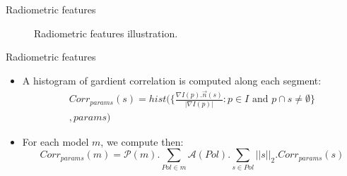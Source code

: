 \documentclass{beamer}
\begin{document}
            \begin{frame}{Radiometric features}
                \begin{figure}

                    \caption{\label{fig::radiometric} Radiometric features illustration.}
                \end{figure}
            \end{frame}
            \begin{frame}{Radiometric features}
                \begin{itemize}[label=$\blacktriangleright$, font=\color{IGNGreen}]
                    \item<1-> A histogram of gardient correlation is computed along each segment:
                    \begin{multline}
                        Corr_{params}(s) = hist \Bigg( \Big\{\frac{\nabla I(p) . \vec{n}(s)}{\vert\nabla I(p)\vert}: p \in I \text{ and } p \cap s \neq \emptyset \Big\}\\
                        , params\Bigg)
                    \end{multline}
                    \item<2-> For each model $m$, we compute then:
                    \begin{equation}
                        Corr_{params}(m) = \mathscr{P}(m) . \sum_{Pol \in m} \mathscr{A}(Pol). \sum_{s \in Pol} \vert\vert s \vert\vert_2. Corr_{params}(s)
                    \end{equation}
                \end{itemize}
            \end{frame}
\end{document}
